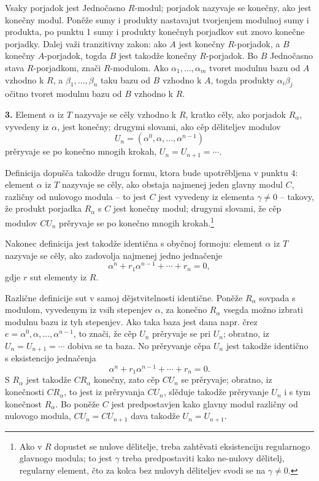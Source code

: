 \documentclass[11pt]{article}
\begin{document}
Vsaky porjadok jest Jednočasno $R$-modul; porjadok nazyvaje se konečny, ako jest konečny modul. Poněže sumy i produkty nastavajut tvorjenjem modulnoj sumy i produkta, po punktu 1 sumy i produkty konečnyh porjadkov sut znovo konečne porjadky. Dalej važi tranzitivny zakon: ako $A$ jest konečny $R$-porjadok, a $B$ konečny $A$-porjadok, togda $B$ jest takodže konečny $R$-porjadok. Bo $B$ Jednočasno stava $R$-porjadkom, znači $R$-modulom. Ako $\alpha_1,\ldots,\alpha_m$ tvoret modulnu bazu od $A$ vzhodno k $R$, a $\beta_1,\ldots,\beta_n$ taku bazu od $B$ vzhodno k $A$, togda produkty $\alpha_i\beta_j$ očitno tvoret modulnu bazu od $B$ vzhodno k $R$.

\textbf{3.} Element $\alpha$ iz $T$ nazyvaje se cěly vzhodno k $R$, kratko cěly, ako porjadok $R_\alpha$, vyvedeny iz $\alpha$, jest konečny; drugymi slovami, ako cěp děliteljev modulov
\[
        U_n=(\alpha^0,\alpha,\ldots,\alpha^{n-1})
\]
prěryvaje se po konečno mnogih krokah, $U_n=U_{n+1}=\cdots$.

Definicija dopušča takodže drugu formu, ktora bude upotrěbljena v punktu 4: element $\alpha$ iz $T$ nazyvaje se cěly, ako obstaja najmenej jeden glavny modul $C$, različny od nulovogo modula -- to jest $C$ jest vyvedeny iz elementa $\gamma\ne0$ -- takovy, že produkt porjadka $R_\alpha$ s $C$ jest konečny modul; drugymi slovami, že cěp modulov $CU_n$ prěryvaje se po konečno mnogih krokah.\footnote{Ako v $R$ dopustet se nulove dělitelje, treba zahtěvati eksistenciju regularnogo glavnogo modula; to jest $\gamma$ treba predpostaviti kako ne-nulovy dělitelj, regularny element, čto za kolca bez nulovyh děliteljev svodi se na $\gamma\ne0$.}

Nakonec definicija jest takodže identična s obyčnoj formoju: element $\alpha$ iz $T$ nazyvaje se cěly, ako zadovolja najmenej jedno jednačenje
\[
        \alpha^n+r_1\alpha^{n-1}+\cdots+r_n=0,
\]
gdje $r$ sut elementy iz $R$.

Različne definicije sut v samoj dějstvitelnosti identične. Poněže $R_\alpha$ sovpada s modulom, vyvedenym iz vsih stepenjev $\alpha$, za konečno $R_\alpha$ vsegda možno izbrati modulnu bazu iz tyh stepenjev. Ako taka baza jest dana napr. črez $e=\alpha^0,\alpha,\ldots,\alpha^{n-1}$, to znači, že cěp $U_n$ prěryvaje se pri $U_n$; obratno, iz $U_n=U_{n+1}=\cdots$ dobiva se ta baza. No prěryvanje cěpa $U_n$ jest takodže identično s eksistencijo jednačenja
\[
        \alpha^n+r_1\alpha^{n-1}+\cdots+r_n=0.
\]
S $R_\alpha$ jest takodže $CR_\alpha$ konečny, zato cěp $CU_n$ se prěryvaje; obratno, iz konečnosti $CR_\alpha$, to jest iz prěryvanja $CU_n$, slěduje takodže prěryvanje $U_n$ i s tym konečnost $R_\alpha$. Bo poněže $C$ jest predpostavjen kako glavny modul različny od nulovogo modula, $CU_n=CU_{n+1}$ dava takodže $U_n=U_{n+1}$.
\end{document}
